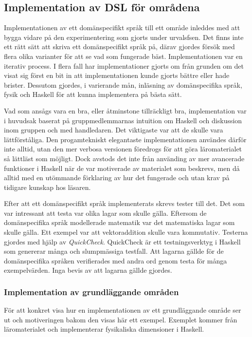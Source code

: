 \begin{draft}

\subsection{Implementation av DSL för områdena}

Implementationen av ett domänspecifikt språk till ett område inleddes med att
bygga vidare på den experimentering som gjorts under urvalsfsen. Det finns inte
ett rätt sätt att skriva ett domänspecifikt språk på, därav gjordes försök med
flera olika varianter för att se vad som fungerade bäst. Implementationen var en
iterativ process. I flera fall har implementationer gjorts om från grunden om
det visat sig först en bit in att implementationen kunde gjorts bättre eller
hade brister. Dessutom gjordes, i varierande mån, inläsning av domänspecifika
språk, fysik och Haskell för att kunna implementera på bästa sätt.

Vad som ansågs vara en bra, eller åtminstone tillräckligt bra, implementation
var i huvudsak baserat på gruppmedlemmarnas intuition om Haskell och diskussion
inom gruppen och med handledaren. Det viktigaste var att de skulle vara
lättförståliga. Den progamtekniskt elegantaste implementationen användes därför
inte alltid, utan den mer verbosa versionen föredrogs för att göra
läromaterialet så lättläst som möjligt. Dock avstods det inte från använding av
mer avancerade funktioner i Haskell när de var motiverade av materialet som
beskrevs, men då alltid med en utömmande förklaring av hur det fungerade och
utan krav på tidigare kunskap hos läsaren.

Efter att ett domänspecifikt språk implementerats skrevs tester till det. Det
som var intressant att testa var olika lagar som skulle gälla. Eftersom de
domänspecifika språk modellerade matematik var det matematiska lagar som skulle
gälla. Ett exempel var att vektoraddition skulle vara kommutativ. Testerna
gjordes med hjälp av \textit{QuickCheck}. QuickCheck är ett testningsverktyg i
Haskell som genererar många och slumpmässiga testfall. Att lagarna gällde för de
domänspecifika språken verifierades med andra ord genom testa för många
exempelvärden. Inga bevis av att lagarna gällde gjordes.

\subsubsection{Implementation av grundläggande områden}

För att konkret visa hur en implementationen av ett grundläggande område ser ut
och motiveringen bakom den visas här ett exempel. Exemplet kommer från
läromaterialet och implementerar fysikaliska dimensioner i Haskell.


\end{draft}
